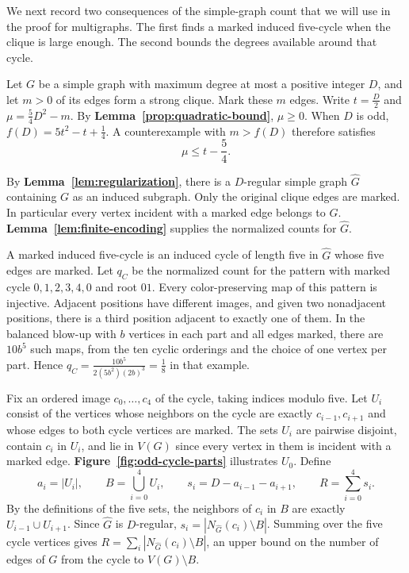 \documentclass[preprint,11pt,numbers]{elsarticle-arxiv}
\numberwithin{equation}{section}
\theoremstyle{definition}
\begin{document}
We next record two consequences of the simple-graph count that we will
use in the proof for multigraphs. The first finds a marked induced
five-cycle when the clique is large enough. The second bounds the
degrees available around that cycle.

Let $G$ be a simple graph with maximum degree at most a positive
integer $D$, and let $m>0$ of its edges form a strong clique.
Mark these $m$ edges. Write $t=\frac{D}{2}$ and
$\mu=\frac{5}{4} D^2-m$. By \textbf{Lemma~\ref{prop:quadratic-bound}},
$\mu\geq0$. When $D$ is odd, $f(D)=5t^2-t+\frac{1}{4}$. A counterexample
with $m>f(D)$ therefore satisfies
\begin{equation}\label{eq:odd-counterexample}
 \mu\leq t-\frac{5}{4}.
\end{equation}

By \textbf{Lemma~\ref{lem:regularization}}, there is a $D$-regular
simple graph $\widehat G$ containing $G$ as an induced subgraph.
Only the original clique edges are marked. In particular every vertex
incident with a marked edge belongs to $G$.
\textbf{Lemma~\ref{lem:finite-encoding}} supplies the normalized
counts for $\widehat G$.

A marked induced five-cycle is an induced cycle of length five in
$\widehat G$ whose five edges are marked. Let $q_C$ be the normalized
count for the pattern with marked cycle $0,1,2,3,4,0$ and root $01$.
Every color-preserving map of this pattern is injective. Adjacent
positions have different images, and given two nonadjacent positions,
there is a third position adjacent to exactly one of them.
In the balanced blow-up with $b$ vertices in each part and all
edges marked, there are $10b^5$ such maps, from the ten cyclic
orderings and the choice of one vertex per part. Hence
$q_C=\frac{10b^5}{2(5b^2)(2b)^3}=\frac{1}{8}$ in that example.

Fix an ordered image $c_0,\ldots,c_4$ of the cycle, taking indices
modulo five. Let $U_i$ consist of the vertices whose neighbors on
the cycle are exactly $c_{i-1},c_{i+1}$ and whose edges to both
cycle vertices are marked. The sets $U_i$ are pairwise disjoint,
contain $c_i$ in $U_i$, and lie in $V(G)$ since every vertex in
them is incident with a marked edge.
\textbf{Figure~\ref{fig:odd-cycle-parts}} illustrates $U_0$. Define
\begin{equation}\label{eq:odd-core-defs}
 a_i=|U_i|,\qquad B=\bigcup_{i=0}^4 U_i,\qquad
 s_i=D-a_{i-1}-a_{i+1},\qquad R=\sum_{i=0}^4 s_i.
\end{equation}
By the definitions of the five sets, the neighbors of $c_i$ in $B$
are exactly $U_{i-1}\cup U_{i+1}$. Since $\widehat G$ is $D$-regular,
$s_i=|N_{\widehat G}(c_i)\setminus B|$. Summing over the five cycle
vertices gives $R=\sum_i|N_{\widehat G}(c_i)\setminus B|$, an upper
bound on the number of edges of $G$ from the cycle to $V(G)\setminus B$.
\end{document}
